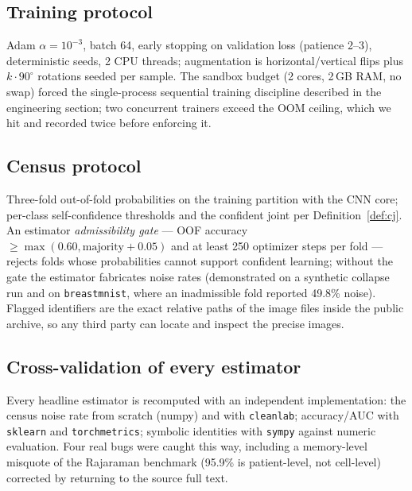 \subsection{Training protocol}
Adam $\alpha{=}10^{-3}$, batch 64, early stopping on validation loss
(patience 2--3), deterministic seeds, 2 CPU threads; augmentation is
horizontal/vertical flips plus $k\cdot90^\circ$ rotations seeded per
sample. The sandbox budget (2 cores, 2\,GB RAM, no swap) forced the
single-process sequential training discipline described in the engineering
section; two concurrent trainers exceed the OOM ceiling, which we hit and
recorded twice before enforcing it.
\subsection{Census protocol}
Three-fold out-of-fold probabilities on the training partition with the CNN
core; per-class self-confidence thresholds and the confident joint per
Definition~\ref{def:cj}. An estimator \emph{admissibility gate} --- OOF
accuracy $\ge \max(0.60, \text{majority}+0.05)$ and at least 250 optimizer
steps per fold --- rejects folds whose probabilities cannot support
confident learning; without the gate the estimator fabricates noise rates
(demonstrated on a synthetic collapse run and on
\texttt{breastmnist}, where an inadmissible fold reported 49.8\% noise).
Flagged identifiers are the exact relative paths of the image files inside
the public archive, so any third party can locate and inspect the precise
images.
\subsection{Cross-validation of every estimator}
Every headline estimator is recomputed with an independent implementation:
the census noise rate from scratch (numpy) and with \texttt{cleanlab};
accuracy/AUC with \texttt{sklearn} and \texttt{torchmetrics}; symbolic
identities with \texttt{sympy} against numeric evaluation. Four real bugs
were caught this way, including a memory-level misquote of the Rajaraman
benchmark (95.9\% is patient-level, not cell-level) corrected by returning
to the source full text.
